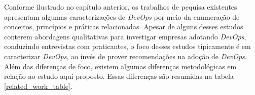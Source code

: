 Conforme ilustrado no capítulo anterior, os trabalhos de pequisa existentes
apresentam algumas caracterizações de \textit{DevOps} por meio da enumeração
de conceitos, princípios e práticas relacionadas. Apesar de alguns desses
estudos conterem abordagens qualitativas para investigar empresas adotando
\textit{DevOps}, conduzindo entrevistas com praticantes, o foco desses estudos
tipicamente é em caracterizar \textit{DevOps}, ao invés de prover recomendações
na adoção de \textit{DevOps}. Além das diferenças de foco, existem algumas
diferenças metodológicas em relação ao estudo aqui proposto. Essas diferenças
são resumidas na tabela \ref{related_work_table}.


